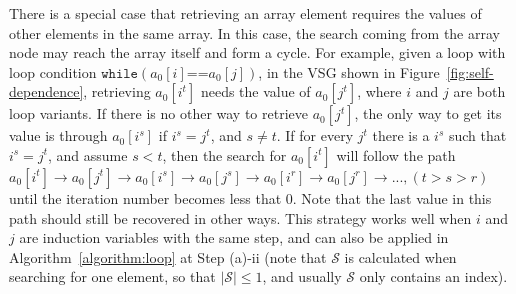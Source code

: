 There is a special case that retrieving an array element requires the values of other elements in the same array. 
In this case, the search coming from the array node may reach the array itself and form a cycle.
For example, given a loop with loop condition $\texttt{while}(a_0[i]\texttt{==}a_0[j])$, in the VSG shown in Figure~\ref{fig:self-dependence}, retrieving $a_0[i^t]$ needs the value of $a_0[j^t]$, where $i$ and $j$ are both loop variants. 
If there is no other way to retrieve $a_0[j^t]$, the only way to get its value is through $a_0[i^s]$ if $i^s = j^t$, and $s\ne t$.
If for every $j^t$ there is a $i^s$ such that $i^s = j^t$, and assume $s<t$, then the search for $a_0[i^t]$ will follow the path $a_0[i^t]\to a_0[j^t]\to a_0[i^s]\to a_0[j^s]\to a_0[i^r]\to a_0[j^r]  \to ..., (t>s>r)$ until the iteration number becomes less that 0. 
Note that the last value in this path should still be recovered in other ways.
This strategy works well when $i$ and $j$ are induction variables with the same step, and can also be applied in Algorithm~\ref{algorithm:loop} at Step (a)-ii (note that  $\mathcal{S}$ is calculated when searching for one element, so that $|\mathcal{S}|\le1$, and usually $\mathcal{S}$ only contains an index).


\begin{comment}
Here we consider the situation that $i$ and $j$ are both induction variables, represented by $i_0+s_i\times t$ and $j_0+s_j\times t$,
where $i_0<j_0$, with final values $i_1$ and $j_1$.
Then those $j$s which can be retrieved from $i$ is the one satisfying the following equation:
$$i_0+s_i\times t_1=j_0+s_j\times t_2, \mbox{where } t_1 > t_2, t_1,t_2 \in [0,\iternum)$$
From above we can get $t_2=(s_i/s_j)t_1+(i_0-j_0)/s_j$.
If $s_i=s_j$ and $(i_0-j_0)\mbox{ mod }s_j=0$, then the subregion $[j_0:s_j:i_1]$ represented by $j$ can be retrieved from $a[i]$.
Since the subregion represented by $j$ is $[j_0:s_j:j_1]$, we have to retrieve the subregion $[j_0:s_j:j_1] - [j_0:s_j:i_1]= [i_1+s_j:s_j:j_1]$ in other ways.

\end{comment}


